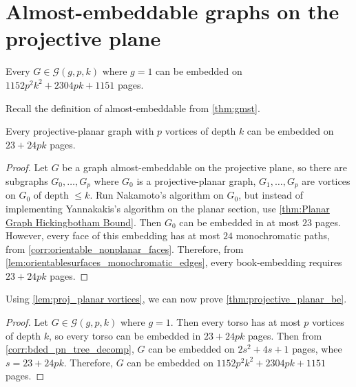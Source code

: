 
\section{Almost-embeddable graphs on the projective plane}

\begin{theorem}\label{thm:projective_planar_be}
	Every $G \in \mathcal{G}(g, p, k)$ where $g = 1$ can be embedded on $1152p^2 k^2 + 2304 pk + 1151$ pages.
\end{theorem}
Recall the definition of almost-embeddable from \cref{thm:gmst}. 
\begin{lemma}\label{lem:proj_planar vortices}
	Every projective-planar graph with $p$ vortices of depth $k$ can be embedded on $23 + 24pk$ pages.
\end{lemma}
\begin{proof}
	Let $G$ be a graph almost-embeddable on the projective plane, so there are subgraphs $G_0, \ldots, G_p$ where $G_0$ is a projective-planar graph, $G_1, \ldots, G_p$ are vortices on $G_0$ of depth $\leq k$. 
	Run Nakamoto's algorithm on $G_0$, but instead of implementing Yannakakis's algorithm on the planar section, use \cref{thm:Planar Graph Hickingbotham Bound}. Then $G_0$ can be embedded in at most $23$ pages. However, every face of this embedding has at most $24$ monochromatic paths, from \cref{corr:orientable_nonplanar_faces}. Therefore, from \cref{lem:orientablesurfaces_monochromatic_edges}, every book-embedding requires $23 + 24pk$ pages.
\end{proof}

Using \cref{lem:proj_planar vortices}, we can now prove \cref{thm:projective_planar_be}.
\begin{proof}
	Let $G \in \mathcal{G}(g, p, k)$ where $g = 1$. Then every torso has at most $p$ vortices of depth $k$, so every torso can be embedded in $23 + 24 pk$ pages. Then from \cref{corr:bded_pn_tree_decomp}, $G$ can be embedded on $2s^2 + 4s + 1$ pages, whee $s = 23 + 24pk$. Therefore, $G$ can be embedded on $1152p^2 k^2 + 2304 pk + 1151$ pages.
\end{proof}
